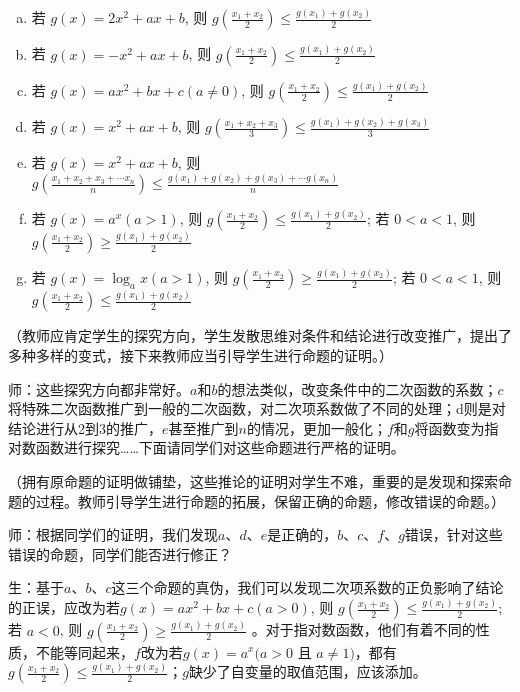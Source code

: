 \begin{enumerate}[a)]
  \item 若 $g(x)=2 x^{2}+a x+b$, 则 $g\left(\frac{x_{1}+x_{2}}{2}\right) \leq \frac{g\left(x_{1}\right)+g\left(x_{2}\right)}{2}$
  \item 若 $g(x)=-x^{2}+a x+b$, 则 $g\left(\frac{x_{1}+x_{2}}{2}\right) \leq \frac{g\left(x_{1}\right)+g\left(x_{2}\right)}{2}$
  \item 若 $g(x)=a x^{2}+b x+c(a \neq 0)$, 则 $g\left(\frac{x_{1}+x_{2}}{2}\right) \leq \frac{g\left(x_{1}\right)+g\left(x_{2}\right)}{2}$
  \item 若 $g(x)=x^{2}+a x+b$, 则 $g\left(\frac{x_{1}+x_{2}+x_{3}}{3}\right) \leq \frac{g\left(x_{1}\right)+g\left(x_{2}\right)+g\left(x_{3}\right)}{3}$
  \item 若 $g(x)=x^{2}+ax+b$, 则 $g\left(\frac{x_{1}+x_{2}+x_{3}+\cdots x_{n}}{n}\right) \leq \frac{g\left(x_{1}\right)+g\left(x_{2}\right)+g\left(x_{3}\right)+\cdots g\left(x_{n}\right)}{n}$
  \item 若 $g(x)=a^{x}(a>1)$, 则 $g\left(\frac{x_{1}+x_{2}}{2}\right) \leq \frac{g\left(x_{1}\right)+g\left(x_{2}\right)}{2}$; 若 $0<a<1$, 则 $g\left(\frac{x_{1}+x_{2}}{2}\right) \geq \frac{g\left(x_{1}\right)+g\left(x_{2}\right)}{2}$
  \item 若 $g(x)=\log _{a} x(a>1)$, 则 $g\left(\frac{x_{1}+x_{2}}{2}\right) \geq \frac{g\left(x_{1}\right)+g\left(x_{2}\right)}{2}$; 若 $0<a<1$, 则 $g\left(\frac{x_{1}+x_{2}}{2}\right) \leq \frac{g\left(x_{1}\right)+g\left(x_{2}\right)}{2}$
\end{enumerate}

（教师应肯定学生的探究方向，学生发散思维对条件和结论进行改变推广，提出了多种多样的变式，接下来教师应当引导学生进行命题的证明。）

师：这些探究方向都非常好。$a$和$b$的想法类似，改变条件中的二次函数的系数；$c$将特殊二次函数推广到一般的二次函数，对二次项系数做了不同的处理；d则是对结论进行从2到3的推广，$e$甚至推广到$n$的情况，更加一般化；$f$和$g$将函数变为指对数函数进行探究……下面请同学们对这些命题进行严格的证明。

（拥有原命题的证明做铺垫，这些推论的证明对学生不难，重要的是发现和探索命题的过程。教师引导学生进行命题的拓展，保留正确的命题，修改错误的命题。）

师：根据同学们的证明，我们发现$a$、$d$、$e$是正确的，$b$、$c$、$f$、$g$错误，针对这些错误的命题，同学们能否进行修正？

生：基于$a$、$b$、$c$这三个命题的真伪，我们可以发现二次项系数的正负影响了结论的正误，应改为若$g(x)=a x^{2}+b x+c(a>0)$, 则 $g\left(\frac{x_{1}+x_{2}}{2}\right) \leq \frac{g(x_{1})+g(x_{2})}{2}$; 若 $a<0$, 则 $g\left(\frac{x_{1}+x_{2}}{2}\right) \geq \frac{g(x_{1})+g(x_{2})}{2}$ 。对于指对数函数，他们有着不同的性质，不能等同起来，$f$改为若$g(x)=a^{x}(a>0$ 且 $a \neq 1)$，都有$g\left(\frac{x_{1}+x_{2}}{2}\right) \leq \frac{g(x_{1})+g(x_{2})}{2}$；$g$缺少了自变量的取值范围，应该添加。

